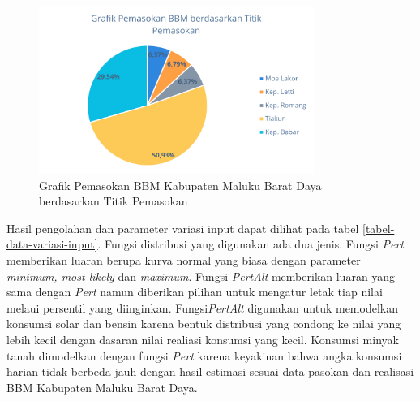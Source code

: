 \begin{figure}[ht!]
    \centering
    \includegraphics[width=0.8\textwidth]{gambar/rasio-psokan-bbm-mbd.png}
    \caption{Grafik Pemasokan BBM Kabupaten Maluku Barat Daya berdasarkan Titik Pemasokan}
    \label{fig:grafik-rasio-pskan-antar-daerah}
\end{figure}

Hasil pengolahan dan parameter variasi input dapat dilihat pada tabel \ref{tabel-data-variasi-input}. Fungsi distribusi yang digunakan ada dua jenis. Fungsi \emph{Pert} memberikan luaran berupa kurva normal yang biasa dengan parameter \emph{minimum, most likely} dan \emph{maximum}. Fungsi \emph{PertAlt} memberikan luaran yang sama dengan \emph{Pert} namun diberikan pilihan untuk mengatur letak tiap nilai melaui persentil yang diinginkan. Fungsi\emph{PertAlt} digunakan untuk memodelkan konsumsi solar dan bensin karena bentuk distribusi yang condong ke nilai yang lebih kecil dengan dasaran nilai realiasi konsumsi yang kecil. Konsumsi minyak tanah dimodelkan dengan fungsi \emph{Pert} karena keyakinan bahwa angka konsumsi harian tidak berbeda jauh dengan hasil estimasi sesuai data pasokan dan realisasi BBM Kabupaten Maluku Barat Daya.

